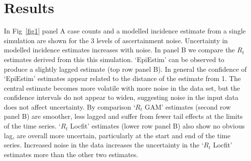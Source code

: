 \documentclass[10pt,letterpaper]{article}
\begin{document}
\section*{Results}

In Fig~\ref{fig1} panel A case counts and a modelled incidence estimate from a single simulation are shown for the 3 levels of ascertainment noise. Uncertainty in modelled incidence estimates increases with noise. In panel B we compare the $R_t$ estimates derived from this this simulation. `EpiEstim' can be observed to produce a slightly lagged estimate (top row panel B). In general the confidence of `EpiEstim' estimates appear related to the distance of the estimate from 1. The central estimate becomes more volatile with more noise in the data set, but the confidence intervals do not appear to widen, suggesting noise in the input data does not affect uncertainty. By comparison `$R_t$ GAM' estimates (second row panel B) are smoother, less lagged and suffer from fewer tail effects at the limits of the time series. `$R_t$ Locfit' estimates (lower row panel B) also show no obvious lag, are overall more uncertain, particularly at the start and end of the time series. Increased noise in the data increases the uncertainty in the `$R_t$ Locfit' estimates more than the other two estimates.
\end{document}
